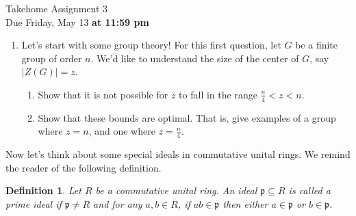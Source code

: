 \documentclass[11pt]{article}
\newtheorem{definition}[theorem]{Definition}
\newcommand{\fp}{\mathfrak{p}}
\begin{document}
\begin{center}
\Large {Takehome Assignment 3}\\
\small {Due Friday, May 13 \textbf{at 11:59 pm}}
\end{center}
\begin{enumerate}
\item{Let's start with some group theory!  For this first question, let $G$ be a finite group of order $n$.  We'd like to understand the size of the center of $G$, say $|Z(G)|  = z$.
\begin{enumerate}
\item{Show that it is not possible for $z$ to fall in the range $\frac{n}{4}<z<n$.}
\item{Show that these bounds are optimal.  That is, give examples of a group where $z=n$, and one where $z=\frac{n}{4}$.}
\end{enumerate}
}
\end{enumerate}
Now let's think about some special ideals in commutative unital rings.  We remind the reader of the following definition.
\begin{definition}
Let $R$ be a commutative unital ring.  An ideal $\fp\subseteq R$ is called a \textit{prime ideal} if $\fp\not=R$ and for any $a,b\in R$, if $ab\in\fp$ then either $a\in\fp$ or $b\in\fp$.
\end{definition}
\end{document}
